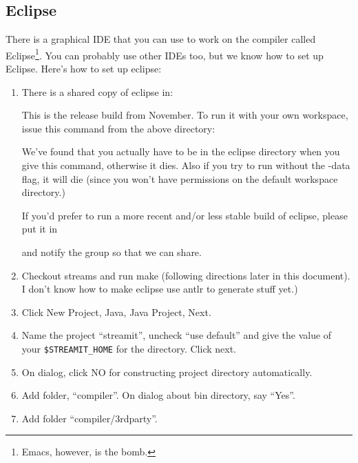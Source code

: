 \subsection{Eclipse}
There is a graphical IDE that you can use to work on the compiler
called Eclipse\footnote{Emacs, however, is the bomb.}. You can
probably use other IDEs too, but we know how to set up Eclipse.
Here's how to set up eclipse:
\begin{enumerate}

\item There is a shared copy of eclipse in:


This is the release build from November.  To run it with your own
workspace, issue this command from the above directory:


We've found that you actually have to be in the eclipse directory when
you give this command, otherwise it dies.  Also if you try to run
without the -data flag, it will die (since you won't have permissions
on the default workspace directory.)

If you'd prefer to run a more recent and/or less stable build of
eclipse, please put it in 


\noindent and notify the group so that we can share.

\item Checkout streams and run make (following directions later in
 this document).  I don't know how to make eclipse use antlr to
 generate stuff yet.)

\item Click New Project, Java, Java Project, Next.

\item Name the project ``streamit'', uncheck ``use default'' and give
the value of your {\tt \$STREAMIT\_HOME} for the directory.  Click
next.

\item On dialog, click NO for constructing project directory
automatically.

\item Add folder, ``compiler''.  On dialog about bin directory, say
``Yes''.

\item Add folder ``compiler/3rdparty''.


\end{enumerate}
